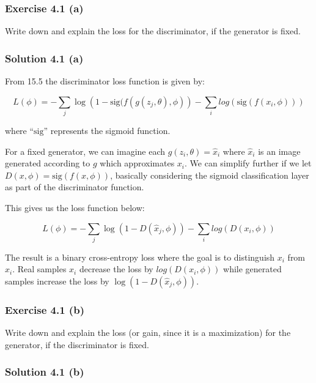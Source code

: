 \documentclass[
10pt, %
a4paper, %
oneside, %
headinclude,footinclude, %
BCOR5mm, %
]{scrartcl}
\begin{document}
\subsubsection*{Exercise 4.1 (a)}
Write down and explain the loss for the discriminator, if the generator is fixed.

\subsubsection*{Solution 4.1 (a)}

From \citet{prince2023understanding} 15.5 the discriminator loss function is given by:

\begin{equation*}
  L(\phi) = - \sum_j \log\left(1 - \textrm{sig}(f(g(z_j, \theta), \phi)\right) - \sum_i log\left(\textrm{sig}(f(x_i, \phi))\right)
\end{equation*}

where ``$\textrm{sig}$'' represents the sigmoid function.

For a fixed generator, we can imagine each $g(z_i, \theta) = \hat{x}_i$ where $\hat{x}_i$ is an image generated according to $g$ which approximates $x_i$. We can simplify further if we let $D(x, \phi) = \textrm{sig}(f(x, \phi))$, basically considering the sigmoid classification layer as part of the discriminator function.

This gives us the loss function below:

\begin{equation*}
  L(\phi) = - \sum_j \log(1 - D(\hat{x}_j, \phi)) - \sum_i log(D(x_i, \phi))
\end{equation*}

The result is a binary cross-entropy loss where the goal is to distinguish $x_i$ from $\hat{x}_i$. Real samples $x_i$ decrease the loss by $log(D(x_i, \phi))$ while generated samples increase the loss by $\log(1-D(\hat{x}_j, \phi))$.

\subsubsection*{Exercise 4.1 (b)}
Write down and explain the loss (or gain, since it is a maximization) for the generator, if the discriminator is fixed.

\subsubsection*{Solution 4.1 (b)}
\end{document}
